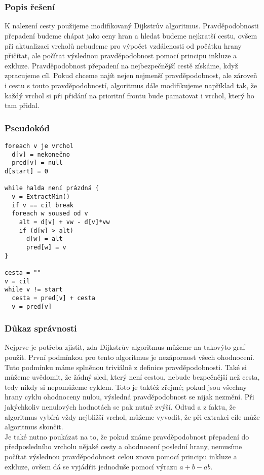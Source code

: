 \documentclass[11pt,a4paper]{article}
\begin{document}
\part*{}
\section{Popis řešení}
K nalezení cesty použijeme modifikovaný Dijkstrův algoritmus. Pravděpodobnosti přepadení budeme chápat jako ceny hran a hledat budeme nejkratší cestu, ovšem při aktualizaci vrcholů nebudeme pro výpočet vzdálenosti od počátku hrany přičítat, ale počítat výslednou pravděpodobnost pomocí principu inkluze a exkluze. Pravděpodobnost přepadení na nejbezpečnější cestě získáme, když zpracujeme cíl. Pokud chceme najít nejen nejmenší pravděpodobnost, ale zároveň i cestu s touto pravděpodobností, algoritmus dále modifikujeme například tak, že každý vrchol si při přidání na prioritní frontu bude pamatovat i vrchol, který ho tam přidal.
\section{Pseudokód}
\begin{verbatim}
foreach v je vrchol
  d[v] = nekonečno
  pred[v] = null
d[start] = 0

while halda není prázdná {
  v = ExtractMin()
  if v == cil break
  foreach w soused od v
    alt = d[v] + vw - d[v]*vw
    if (d[w] > alt)
      d[w] = alt
      pred[w] = v
}

cesta = ""
v = cil
while v != start
  cesta = pred[v] + cesta
  v = pred[v]     
\end{verbatim}
\section{Důkaz správnosti}
Nejprve je potřeba zjistit, zda Dijkstrův algoritmus můžeme na takovýto graf použít. První podmínkou pro tento algoritmus je nezápornost všech ohodnocení. Tuto podmínku máme splněnou triviálně z definice pravděpodobnosti. Také si můžeme uvědomit, že žádný sled, který není cestou, nebude bezpečnější než cesta, tedy nikdy si nepomůžeme cyklem. Toto je taktéž zřejmé; pokud jsou všechny hrany cyklu ohodnoceny nulou, výsledná pravděpodobnost se nijak nezmění. Při jakýchkoliv nenulových hodnotách se pak nutně zvýší. Odtud a z faktu, že algoritmus vybírá vždy nejbližší vrchol, můžeme vyvodit, že při extrakci cíle může algoritmus skončit. \\

Je také nutno poukázat na to, že pokud známe pravděpodobnost přepadení do předposledního vrcholu nějaké cesty a ohodnocení poslední hrany, nemusíme počítat výslednou pravděpodobnost celou znovu pomocí principu inkluze a exkluze, ovšem dá se vyjádřit jednoduše pomocí výrazu $a+b-ab$. \\
\end{document}
